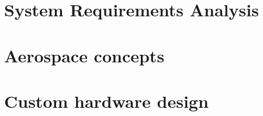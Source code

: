 \documentclass[12pt]{report}
\begin{document}

\chapter{System Requirements Analysis}

\chapter{Aerospace concepts}
\chapter{Custom hardware design}
\end{document}
